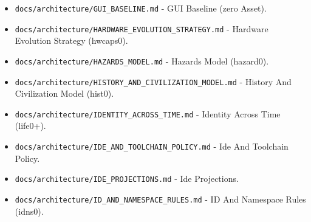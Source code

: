 \documentclass[9pt,a4paper,openany]{book}
\begin{document}
\begin{itemize}
\item \texttt{docs/\allowbreak{}architecture/\allowbreak{}GUI\_\allowbreak{}BASELINE.\allowbreak{}md} -\allowbreak{} GUI Baseline (zero Asset).\allowbreak{}
\end{itemize}

\begin{itemize}
\item \texttt{docs/\allowbreak{}architecture/\allowbreak{}HARDWARE\_\allowbreak{}EVOLUTION\_\allowbreak{}STRATEGY.\allowbreak{}md} -\allowbreak{} Hardware Evolution Strategy (hwcaps0).\allowbreak{}
\end{itemize}

\begin{itemize}
\item \texttt{docs/\allowbreak{}architecture/\allowbreak{}HAZARDS\_\allowbreak{}MODEL.\allowbreak{}md} -\allowbreak{} Hazards Model (hazard0).\allowbreak{}
\end{itemize}

\begin{itemize}
\item \texttt{docs/\allowbreak{}architecture/\allowbreak{}HISTORY\_\allowbreak{}AND\_\allowbreak{}CIVILIZATION\_\allowbreak{}MODEL.\allowbreak{}md} -\allowbreak{} History And Civilization Model (hist0).\allowbreak{}
\end{itemize}

\begin{itemize}
\item \texttt{docs/\allowbreak{}architecture/\allowbreak{}IDENTITY\_\allowbreak{}ACROSS\_\allowbreak{}TIME.\allowbreak{}md} -\allowbreak{} Identity Across Time (life0+).\allowbreak{}
\end{itemize}

\begin{itemize}
\item \texttt{docs/\allowbreak{}architecture/\allowbreak{}IDE\_\allowbreak{}AND\_\allowbreak{}TOOLCHAIN\_\allowbreak{}POLICY.\allowbreak{}md} -\allowbreak{} Ide And Toolchain Policy.\allowbreak{}
\end{itemize}

\begin{itemize}
\item \texttt{docs/\allowbreak{}architecture/\allowbreak{}IDE\_\allowbreak{}PROJECTIONS.\allowbreak{}md} -\allowbreak{} Ide Projections.\allowbreak{}
\end{itemize}

\begin{itemize}
\item \texttt{docs/\allowbreak{}architecture/\allowbreak{}ID\_\allowbreak{}AND\_\allowbreak{}NAMESPACE\_\allowbreak{}RULES.\allowbreak{}md} -\allowbreak{} ID And Namespace Rules (idns0).\allowbreak{}
\end{itemize}
\end{document}
